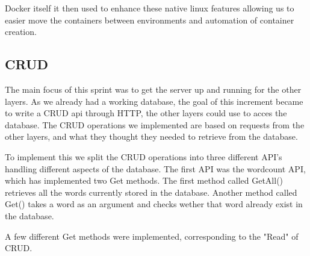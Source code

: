 Docker itself it then used to enhance these native linux features allowing us to easier move the containers between environments and automation of container creation.

    









\subsection{CRUD}

The main focus of this sprint was to get the server up and running for the other layers. 
As we already had a working database, the goal of this increment became to write a CRUD api through HTTP, 
the other layers could use to acces the database.
The CRUD operations we implemented are based on requests from the other layers, and what they thought they needed to retrieve from the database.

To implement this we split the CRUD operations into three different API's handling different aspects of the database.
The first API was the wordcount API, which has implemented two Get methods.
The first method called GetAll() retrieves all the words currently stored in the database.
Another method called Get() takes a word as an argument and checks wether that word already exist in the database.


A few different Get methods were implemented, corresponding to the "Read" of CRUD.

